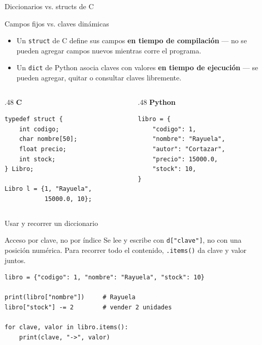\documentclass{beamer}
\begin{document}
\begin{frame}[fragile]{Diccionarios vs. structs de C}
  \begin{block}{Campos fijos vs. claves dinámicas}
    \begin{itemize}
      \item Un \texttt{struct} de C define sus campos \textbf{en tiempo
      de compilación} — no se pueden agregar campos nuevos mientras corre el programa.
      \item Un \texttt{dict} de Python asocia claves con valores \textbf{en
      tiempo de ejecución} — se pueden agregar, quitar o consultar claves libremente.
    \end{itemize}
  \end{block}
  \begin{columns}[T]
    \begin{column}{.48\textwidth}
      \centering\textbf{C}
      \begin{verbatim}
typedef struct {
    int codigo;
    char nombre[50];
    float precio;
    int stock;
} Libro;

Libro l = {1, "Rayuela",
           15000.0, 10};
      \end{verbatim}
    \end{column}
    \begin{column}{.48\textwidth}
      \centering\textbf{Python}
      \begin{verbatim}
libro = {
    "codigo": 1,
    "nombre": "Rayuela",
    "autor": "Cortazar",
    "precio": 15000.0,
    "stock": 10,
}
      \end{verbatim}
    \end{column}
  \end{columns}
\end{frame}

\begin{frame}[fragile]{Usar y recorrer un diccionario}
  \begin{block}{Acceso por clave, no por índice}
    Se lee y escribe con \texttt{d["clave"]}, no con una posición numérica.
    Para recorrer todo el contenido, \texttt{.items()} da clave y valor juntos.
  \end{block}
  \begin{verbatim}
libro = {"codigo": 1, "nombre": "Rayuela", "stock": 10}

print(libro["nombre"])     # Rayuela
libro["stock"] -= 2        # vender 2 unidades

for clave, valor in libro.items():
    print(clave, "->", valor)
  \end{verbatim}
\end{frame}
\end{document}
